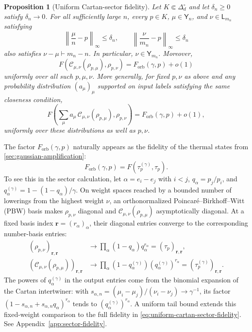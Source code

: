 \documentclass[11pt]{article}
\newtheorem{proposition}[proposition]{Proposition}
\theoremstyle{remark}
\theoremstyle{plain}
\newcommand{\cC}{\mathcal C}
\newcommand{\Forb}{F_{\mathrm{orb}}}
\begin{document}
\begin{proposition}[Uniform Cartan-sector fidelity]
\label{prop:sector-fidelity}
Let \(K\Subset\Delta_d^\circ\) and let \(\delta_n\ge0\) satisfy
\(\delta_n\to0\).  For all sufficiently large \(n\), every
\(p\in K\), \(\mu\in\mathsf Y_n\), and \(\nu\in\mathsf L_{m_n}\) satisfying
\[
  \left\|\frac\mu n-p\right\|_\infty\le\delta_n,
  \qquad
  \left\|\frac\nu{m_n}-p\right\|_\infty\le\delta_n
\]
also satisfies \(\nu-\mu\vdash m_n-n\).  In particular,
\(\nu\in\mathsf Y_{m_n}\).  Moreover,
\begin{equation}\label{eq:uniform-cartan-sector-fidelity}
  F\!\left(\cC_{\mu,\nu}(\rho_{p,\mu}),\rho_{p,\nu}\right)
  =\Forb(\gamma,p)+o(1)
\end{equation}
uniformly over all such \(p,\mu,\nu\).
More generally, for fixed \(p,\nu\) as above and any probability distribution
\((a_\mu)_\mu\) supported on input labels satisfying the same closeness
condition,
\begin{equation}\label{eq:sector-mixture-fidelity}
  F\!\left(
    \sum_\mu a_\mu\,
      \cC_{\mu,\nu}(\rho_{p,\mu}),
    \rho_{p,\nu}
  \right)
  =\Forb(\gamma,p)+o(1),
\end{equation}
uniformly over these distributions as well as \(p,\nu\).
\end{proposition}

The factor \(\Forb(\gamma,p)\) naturally appears as the fidelity of the
thermal states from \cref{sec:gaussian-amplification}:
\[
  \Forb(\gamma,p)=F(\tau_p^{(\gamma)},\tau_p).
\]
To see this in the sector calculation, let \(\alpha=e_i-e_j\) with
\(i<j\), \(q_\alpha=p_j/p_i\), and
\(q_\alpha^{(\gamma)}=1-(1-q_\alpha)/\gamma\).  On weight spaces reached
by a bounded number of lowerings from the highest weight \(\nu\), an
orthonormalized Poincar\'e--Birkhoff--Witt (PBW) basis makes \(\rho_{p,\nu}\) diagonal and
\(\cC_{\mu,\nu}(\rho_{p,\mu})\) asymptotically diagonal.  At a fixed
basis index \(\mathbf r=(r_\alpha)_\alpha\), their diagonal entries
converge to the corresponding number-basis entries:
\[
\begin{aligned}
  (\rho_{p,\nu})_{\mathbf r,\mathbf r}
  &\longrightarrow \prod_\alpha(1-q_\alpha)q_\alpha^{r_\alpha}
   =(\tau_p)_{\mathbf r,\mathbf r},\\
  (\cC_{\mu,\nu}(\rho_{p,\mu}))_{\mathbf r,\mathbf r}
  &\longrightarrow \prod_\alpha(1-q_\alpha^{(\gamma)})
   (q_\alpha^{(\gamma)})^{r_\alpha}
   =(\tau_p^{(\gamma)})_{\mathbf r,\mathbf r}.
\end{aligned}
\]
The powers of \(q_\alpha^{(\gamma)}\) in the output entries come from the
binomial expansion of the Cartan intertwiner: with
\(s_{\alpha,n}=(\mu_i-\mu_j)/(\nu_i-\nu_j)\to\gamma^{-1}\), its factor
\((1-s_{\alpha,n}+s_{\alpha,n}q_\alpha)^{r_\alpha}\) tends to
\((q_\alpha^{(\gamma)})^{r_\alpha}\).  A uniform tail bound extends this
fixed-weight comparison to the full fidelity in
\eqref{eq:uniform-cartan-sector-fidelity}.  See
Appendix~\ref{app:sector-fidelity}.
\end{document}
